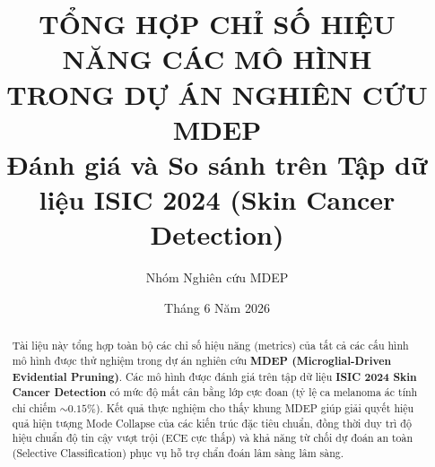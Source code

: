 \documentclass[11pt, a4paper]{article}
\begin{document}

\title{
    \textbf{TỔNG HỢP CHỈ SỐ HIỆU NĂNG CÁC MÔ HÌNH\\TRONG DỰ ÁN NGHIÊN CỨU MDEP} \\[6pt]
    \large Đánh giá và So sánh trên Tập dữ liệu ISIC 2024 (Skin Cancer Detection)
}
\author{Nhóm Nghiên cứu MDEP}
\date{Tháng 6 Năm 2026}

\maketitle

\begin{abstract}
Tài liệu này tổng hợp toàn bộ các chỉ số hiệu năng (metrics) của tất cả các cấu hình mô hình được thử nghiệm trong dự án nghiên cứu \textbf{MDEP (Microglial-Driven Evidential Pruning)}. Các mô hình được đánh giá trên tập dữ liệu \textbf{ISIC 2024 Skin Cancer Detection} có mức độ mất cân bằng lớp cực đoan (tỷ lệ ca melanoma ác tính chỉ chiếm $\sim 0.15\%$). Kết quả thực nghiệm cho thấy khung MDEP giúp giải quyết hiệu quả hiện tượng Mode Collapse của các kiến trúc đặc tiêu chuẩn, đồng thời duy trì độ hiệu chuẩn độ tin cậy vượt trội (ECE cực thấp) và khả năng từ chối dự đoán an toàn (Selective Classification) phục vụ hỗ trợ chẩn đoán lâm sàng lâm sàng.
\end{abstract}
\end{document}
